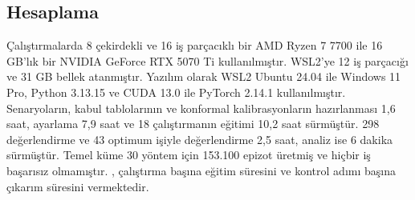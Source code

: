 \subsection{Hesaplama}\label{app:compute}

Çalıştırmalarda 8 çekirdekli ve 16 iş parçacıklı bir AMD Ryzen 7 7700 ile 16 GB'lık bir NVIDIA GeForce RTX 5070 Ti kullanılmıştır.
WSL2'ye 12 iş parçacığı ve 31 GB bellek atanmıştır.
Yazılım olarak WSL2 Ubuntu 24.04 ile Windows 11 Pro, Python 3.13.15 ve CUDA 13.0 ile PyTorch 2.14.1 kullanılmıştır.
Senaryoların, kabul tablolarının ve konformal kalibrasyonların hazırlanması 1,6 saat, ayarlama 7,9 saat ve 18 çalıştırmanın eğitimi 10,2 saat sürmüştür.
298 değerlendirme ve 43 optimum işiyle değerlendirme 2,5 saat, analiz ise 6 dakika sürmüştür.
Temel küme 30 yöntem için 153.100 epizot üretmiş ve hiçbir iş başarısız olmamıştır.
, çalıştırma başına eğitim süresini ve kontrol adımı başına çıkarım süresini vermektedir.
